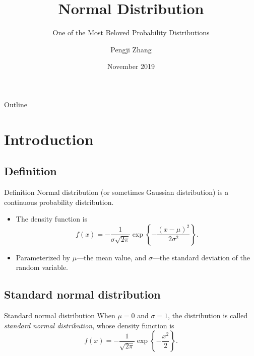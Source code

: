 \documentclass{beamer}
\title{Normal Distribution}
\subtitle{One of the Most Beloved Probability Distributions}
\author{Pengji Zhang}
\institute{Carnegie Mellon University}
\date{November 2019}
\begin{document}
\begin{frame}
  \titlepage{}
\end{frame}

\begin{frame}{Outline}
  \tableofcontents
\end{frame}

\section{Introduction}

\subsection{Definition}

\begin{frame}{Definition}
  Normal distribution (or sometimes Gaussian distribution) is a continuous
  probability distribution.
  \begin{itemize}
  \item<1-> The density function is
    \begin{equation}
      f(x) = -\frac{1}{\sigma\sqrt{2\pi}}\exp\left\{ -\frac{{\left( x - \mu
            \right)}^{2}}{2\sigma^{2}} \right\}.
    \end{equation}
  \item<2-> Parameterized by \(\mu\)---the mean value, and \(\sigma\)---the
    standard deviation of the random variable.
  \end{itemize}
\end{frame}

\subsection{Standard normal distribution}

\begin{frame}{Standard normal distribution}
  When \(\mu = 0\) and \(\sigma = 1\), the distribution is called
  \emph{standard normal distribution}, whose density function is
  \begin{equation}
    f(x) = -\frac{1}{\sqrt{2\pi}}\exp\left\{ -\frac{x^{2}}{2} \right\}.
  \end{equation}
\end{frame}
\end{document}
